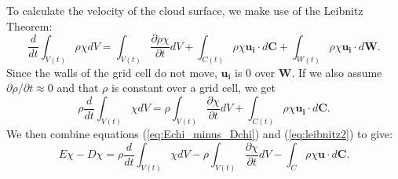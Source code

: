 \documentclass[12pt]{article}
\begin{document}
To calculate the velocity of the cloud surface, we make use of the Leibnitz 
Theorem:
\begin{equation}
\label{eq:leibnitz} 
\frac{d}{dt}\int_{V(t)} \rho \chi dV = 
  \int_{V(t)} \frac{\partial \rho \chi}{ \partial t} dV 
  + \int_{C(t)} \rho \chi \mathbf{u_i}\cdot d\mathbf{C}
  + \int_{W(t)} \rho \chi \mathbf{u_i}\cdot d\mathbf{W}.
\end{equation}
Since the walls of the grid cell do not move, $\mathbf{u_i}$ is 0 over 
$\mathbf{W}$.  If we also assume ${\partial \rho}/{ \partial t} \approx 0$ and 
that $\rho$ is constant over a grid cell, we get
\begin{equation}
\label{eq:leibnitz2} 
    \rho \frac{d}{dt}\int_{V(t)} \chi dV = 
    \rho \int_{V(t)} \frac{\partial \chi}{ \partial t} dV 
    + \int_{C(t)} \rho \chi \mathbf{u_i}\cdot d\mathbf{C}.
\end{equation}
We then combine equations (\ref{eq:Echi_minus_Dchi}) and (\ref{eq:leibnitz2}) to give:
\begin{equation}
\label{eq:step1} 
      E\chi - D\chi = \rho \frac{d}{dt}\int_{V(t)} \chi dV
                    - \rho \int_{V(t)} \frac{\partial \chi}{ \partial t} dV 
                    - \int_C \rho \chi \mathbf{u} \cdot d\mathbf{C}.
\end{equation}
\end{document}
